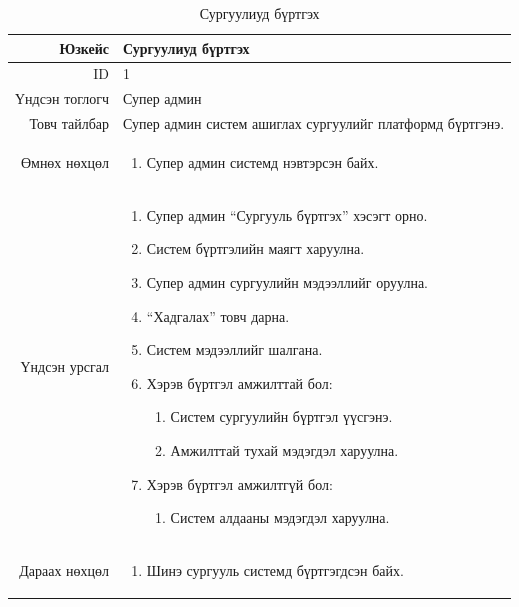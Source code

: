 \begin{longtable}{|r|p{11cm}|}
\caption{Сургуулиуд бүртгэх}
\label{table:usecase1}\\ \hline
Юзкейс & Сургуулиуд бүртгэх \\ \hline
ID & 1 \\ \hline
Үндсэн тоглогч & Супер админ \\ \hline
Товч тайлбар & Супер админ систем ашиглах
сургуулийг платформд бүртгэнэ. \\ \hline
Өмнөх нөхцөл &
\begin{enumerate}[nosep]
\item Супер админ системд нэвтэрсэн байх.
\end{enumerate} \\ \hline
Үндсэн урсгал &
\begin{enumerate}[nosep]
\item Супер админ ``Сургууль бүртгэх'' хэсэгт орно.
\item Систем бүртгэлийн маягт харуулна.
\item Супер админ сургуулийн мэдээллийг оруулна.
\item ``Хадгалах'' товч дарна.
\item Систем мэдээллийг шалгана.
\item Хэрэв бүртгэл амжилттай бол:
\begin{enumerate}[nosep,label*=\arabic*.]
\item Систем сургуулийн бүртгэл үүсгэнэ.
\item Амжилттай тухай мэдэгдэл харуулна.
\end{enumerate}
\item Хэрэв бүртгэл амжилтгүй бол:
\begin{enumerate}[nosep,label*=\arabic*.]
\item Систем алдааны мэдэгдэл харуулна.
\end{enumerate}
\end{enumerate} \\ \hline
Дараах нөхцөл &
\begin{enumerate}[nosep]
\item Шинэ сургууль системд бүртгэгдсэн байх.
\end{enumerate} \\ \hline
\end{longtable}

